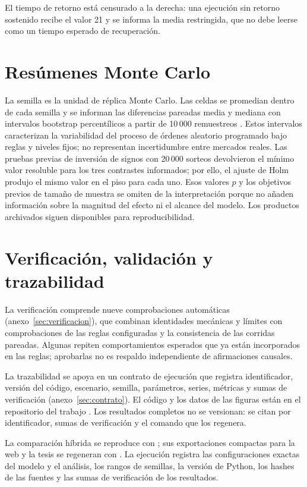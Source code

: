 El tiempo de retorno está censurado a la derecha: una ejecución sin retorno sostenido recibe el valor 21 y se informa la media restringida, que no debe leerse como un tiempo esperado de recuperación.

\section{Resúmenes Monte Carlo}
\label{sec:analisis-estadistico}

La semilla es la unidad de réplica Monte Carlo. Las celdas se promedian dentro de cada semilla y se informan las diferencias pareadas media y mediana con intervalos bootstrap percentílicos a partir de 10\,000 remuestreos \cite{efron1979bootstrap}. Estos intervalos caracterizan la variabilidad del proceso de órdenes aleatorio programado bajo reglas y niveles fijos; no representan incertidumbre entre mercados reales. Las pruebas previas de inversión de signos con 20\,000 sorteos devolvieron el mínimo valor resoluble para los tres contrastes informados; por ello, el ajuste de Holm produjo el mismo valor en el piso para cada uno. Esos valores $p$ y los objetivos previos de tamaño de muestra se omiten de la interpretación porque no añaden información sobre la magnitud del efecto ni el alcance del modelo. Los productos archivados siguen disponibles para reproducibilidad.

\section{Verificación, validación y trazabilidad}

La verificación comprende nueve comprobaciones automáticas (anexo~\ref{sec:verificacion}), que combinan identidades mecánicas y límites con comprobaciones de las reglas configuradas y la consistencia de las corridas pareadas. Algunas repiten comportamientos esperados que ya están incorporados en las reglas; aprobarlas no es respaldo independiente de afirmaciones causales.

La trazabilidad se apoya en un contrato de ejecución que registra identificador, versión del código, escenario, semilla, parámetros, series, métricas y sumas de verificación (anexo~\ref{sec:contrato}). El código y los datos de las figuras están en el repositorio del trabajo \cite{calderon2026repository}. Los resultados completos no se versionan: se citan por identificador, sumas de verificación y el comando que los regenera.

La comparación híbrida se reproduce con ; sus exportaciones compactas para la web y la tesis se regeneran con . La ejecución \code{\HybridRunID} registra las configuraciones exactas del modelo y el análisis, los rangos de semillas, la versión de Python, los hashes de las fuentes y las sumas de verificación de los resultados.
